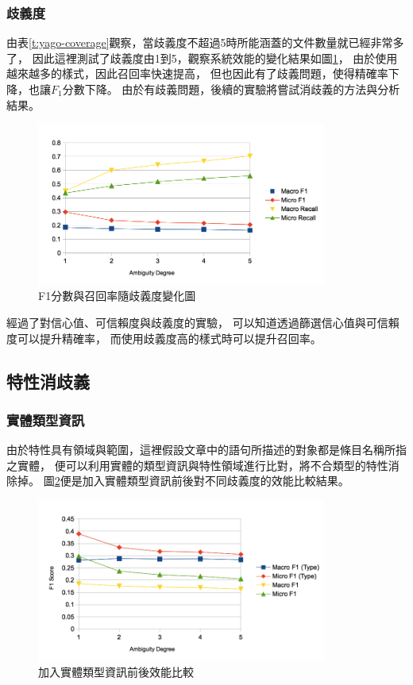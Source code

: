 

\subsubsection{歧義度}
由表\ref{t:yago-coverage}觀察，當歧義度不超過5時所能涵蓋的文件數量就已經非常多了，
因此這裡測試了歧義度由1到5，觀察系統效能的變化結果如圖\ref{i:degree}，
由於使用越來越多的樣式，因此召回率快速提高，
但也因此有了歧義問題，使得精確率下降，也讓$F_1$分數下降。
由於有歧義問題，後續的實驗將嘗試消歧義的方法與分析結果。

\begin{figure}[h]
    \centering
    \includegraphics[width=0.85\textwidth]{images/04-degree}
    \caption{F1分數與召回率隨歧義度變化圖}
    \label{i:degree}
\end{figure}

經過了對信心值、可信賴度與歧義度的實驗，
可以知道透過篩選信心值與可信賴度可以提升精確率，
而使用歧義度高的樣式時可以提升召回率。

\subsection{特性消歧義}
\subsubsection{實體類型資訊}
由於特性具有領域與範圍，這裡假設文章中的語句所描述的對象都是條目名稱所指之實體，
便可以利用實體的類型資訊與特性領域進行比對，將不合類型的特性消除掉。
圖\ref{i:type}便是加入實體類型資訊前後對不同歧義度的效能比較結果。

\begin{figure}[h]
    \centering
    \includegraphics[width=0.85\textwidth]{images/04-type}
    \caption{加入實體類型資訊前後效能比較 }
    \label{i:type}
\end{figure}

